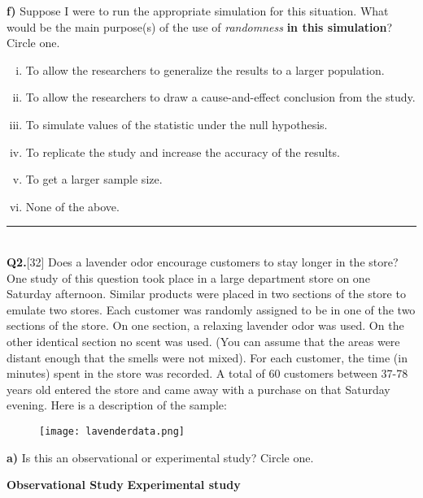 \documentclass[12pt, oneside]{article}
\newcommand{\noi}{\noindent}
\begin{document}
\noi
{\bf f)} Suppose I were to run the appropriate simulation for this situation. What would be the main purpose(s) of the use of \emph{randomness} {\bf in this simulation}? Circle one.
\begin{enumerate} [(i)]
\item To allow the researchers to generalize the results to a larger population.
\item To allow the researchers to draw a cause-and-effect conclusion from the study.
\item To simulate values of the statistic under the null hypothesis.
\item To replicate the study and increase the accuracy of the results.
\item To get a larger sample size.
\item None of the above.
\end{enumerate}
\vspace{.25in}

\noi
\rule{7.5in}{.02in} \\
\noi
{\bf Q2.}[32] Does a lavender odor encourage customers to stay longer in the store? One study of this question took place in a large department store on one Saturday afternoon. Similar products were placed in two sections of the store to emulate two stores. Each customer was randomly assigned to be in one of the two sections of the store. On one section, a relaxing lavender odor was used. On the other identical section no scent was used. (You can assume that the areas were distant enough that the smells were not mixed). For each customer, the time (in minutes) spent in the store was recorded. A total of 60 customers between 37-78 years old entered the store and came away with a purchase on that Saturday evening. Here is a description of the sample:\\ 

\begin{figure}[h!]
\centering
\texttt{[image: lavenderdata.png]}
\end{figure}
\vspace{.05in}

\noi
{\bf a)} Is this an observational or experimental study? Circle one.
\begin{center}
{\bf Observational Study} \hspace{1in} {\bf Experimental study}
\end{center}
\vspace{0.1in}
\end{document}
